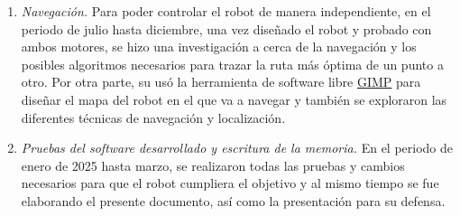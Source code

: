\begin{enumerate}
 \item \textit{Navegación.} Para poder controlar el robot de manera independiente, en el periodo de julio hasta diciembre, una vez diseñado el robot y probado con ambos motores, se hizo una investigación a cerca de la navegación y los posibles algoritmos necesarios para trazar la ruta más óptima de un punto a otro. Por otra parte, su usó la herramienta de software libre \hyperlink{GIMP}{GIMP} para diseñar el mapa del robot en el que va a navegar y también se exploraron las diferentes técnicas de navegación y localización.
 
   \item \textit{Pruebas del software desarrollado y escritura de la memoria.} En el periodo de enero de 2025 hasta marzo, se realizaron todas las pruebas y cambios necesarios para que el robot cumpliera el objetivo y al mismo tiempo se fue elaborando el presente documento, así como la presentación para su defensa.
\end{enumerate}\
















